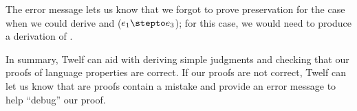 The error message lets us know that we forgot to prove preservation
for the case when we could derive 
and  ($e_1 \stepto e_3$); for this case,
we would need to produce a derivation of .

In summary, Twelf can aid with deriving simple judgments and checking
that our proofs of language properties are correct.
If our proofs are not correct, Twelf can let us know that are proofs
contain a mistake and provide an error message to help ``debug'' our proof.
